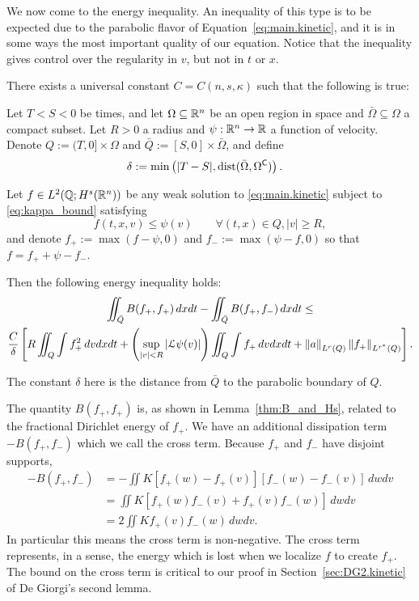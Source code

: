 We now come to the energy inequality.  An inequality of this type is to be expected due to the parabolic flavor of Equation~\eqref{eq:main.kinetic}, and it is in some ways the most important quality of our equation.  Notice that the inequality gives control over the regularity in $v$, but not in $t$ or $x$.  

\begin{lemma} \label{thm:energy_inequality}
There exists a universal constant $C = C(n,s,\kappa)$ such that the following is true:

Let $T < S < 0$ be times, and let $\Omega \subseteq \mathbb{R}^n$ be an open region in space and $\bar{\Omega} \subseteq \Omega$ a compact subset.  Let $R > 0$ a radius and $\psi:\mathbb{R}^n \to \mathbb{R}$ a function of velocity.  Denote $Q := (T,0] \times \Omega$ and $\bar{Q} := [S,0]\times\bar{\Omega}$, and define
\begin{align*} 
\delta &:= \min\left( |T-S|, \operatorname{dist}(\bar{\Omega}, \Omega^\mathsf{C}) \right).
\end{align*}

Let $f \in L^2(\mathbb{Q}; H^s(\mathbb{R}^n))$ be any weak solution to \eqref{eq:main.kinetic} subject to \eqref{eq:kappa_bound} satisfying
\[ f(t,x,v) \leq \psi(v) \qquad \forall (t,x) \in Q, |v| \geq R, \] 
and denote $f_+ := \max(f-\psi,0)$ and $f_- := \max(\psi-f,0)$ so that $f = f_+ + \psi - f_-$.  

Then the following energy inequality holds:
\begin{multline*}%
\iint_{\bar{Q}} B(f_+,f_+) \,dxdt - \iint_{\bar{Q}} B(f_+,f_-) \,dxdt \leq \\
\frac{C}{\delta} \bracket{ R \iint_Q \int f_+^2 \,dvdxdt + \paren{\sup_{|v|<R}\abs{\L\psi(v)}} \iint_Q \int f_+ \,dvdxdt + \norm{a}_{L^\sourceexp(Q)} \norm{f_+}_{L^{\sourceexp^\ast}(Q)} }. 
\end{multline*}
\end{lemma}

The constant $\delta$ here is the distance from $\bar{Q}$ to the parabolic boundary of $Q$.  

The quantity $B(f_+,f_+)$ is, as shown in Lemma~\ref{thm:B_and_Hs}, related to the fractional Dirichlet energy of $f_+$.  We have an additional dissipation term $-B(f_+,f_-)$ which we call the cross term.  Because $f_+$ and $f_-$ have disjoint supports,
\begin{align*}
-B(f_+,f_-) &= -\iint K [f_+(w)-f_+(v)][f_-(w)-f_-(v)]\,dwdv
\\ &= \iint K [f_+(w)f_-(v) + f_+(v)f_-(w)] \,dwdv
\\ &= 2 \iint K f_+(v)f_-(w) \,dwdv.
\end{align*} 
In particular this means the cross term is non-negative.  The cross term represents, in a sense, the energy which is lost when we localize $f$ to create $f_+$.  The bound on the cross term is critical to our proof in Section~\ref{sec:DG2.kinetic} of De Giorgi's second lemma.  

